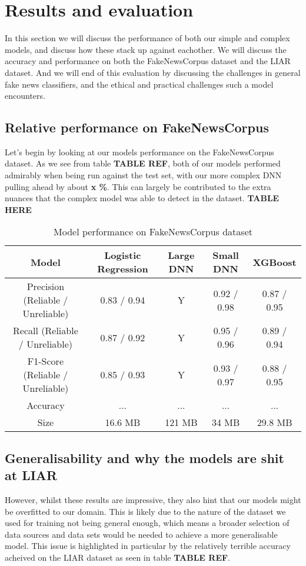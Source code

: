 \section{Results and evaluation}
In this section we will discuss the performance of both our simple and complex models, and discuss how these stack up
against eachother. We will discuss the accuracy and performance on both the FakeNewsCorpus dataset and the LIAR
dataset. And we will end of this evaluation by discussing the challenges in general fake news classifiers, and the
ethical and practical challenges such a model encounters.

\subsection{Relative performance on FakeNewsCorpus}
Let's begin by looking at our models performance on the FakeNewsCorpus dataset. As we see from table \textbf{TABLE REF},
both of our models performed admirably when being run against the test set, with our more complex DNN pulling ahead by
about \textbf{x \%}. This can largely be contributed to the extra nuances that the complex model was able to detect in
the dataset.
\newline
\textbf{TABLE HERE}
\newline

\begin{table}[htpb]
  \centering
  \caption{Model performance on FakeNewsCorpus dataset}
  \label{tab:fakenewsperformance}

  \begin{tabular}{c|cccc}
    Model & Logistic Regression & Large DNN & Small DNN & XGBoost \\ \hline
    Precision (Reliable / Unreliable) & 0.83 / 0.94 & Y & 0.92 / 0.98 & 0.87 / 0.95 \\ \hline
    Recall (Reliable / Unreliable) & 0.87 / 0.92 & Y & 0.95 / 0.96 & 0.89 / 0.94 \\ \hline
    F1-Score (Reliable / Unreliable) & 0.85 / 0.93 & Y & 0.93 / 0.97 & 0.88 / 0.95 \\ \hline
    Accuracy & ... & ... & ... & ... \\ \hline
    Size & 16.6 MB & 121 MB & 34 MB & 29.8 MB 
  \end{tabular}
\end{table}

\subsection{Generalisability and why the models are shit at LIAR}
However, whilst these results are impressive, they also hint that our models might be overfitted to our domain. This is
likely due to the nature of the dataset we used for training not being general enough, which means a broader selection
of data sources and data sets would be needed to achieve a more generalisable model. This issue is highlighted in
particular by the relatively terrible accuracy acheived on the LIAR dataset as seen in table \textbf{TABLE REF}.

